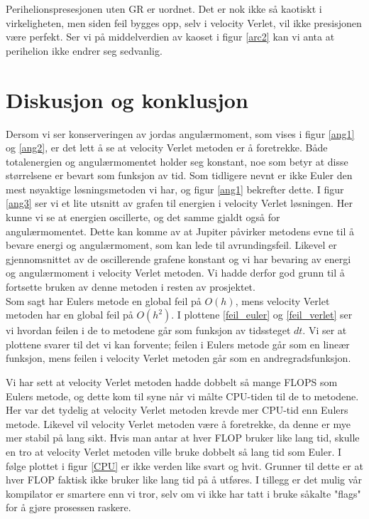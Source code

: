 \documentclass[11pt,a4paper]{article}
\begin{document}
Perihelionspresesjonen uten GR er uordnet. Det er nok ikke så kaotiskt i virkeligheten, men siden feil bygges opp, selv i velocity Verlet, vil ikke presisjonen være perfekt. Ser vi på middelverdien av kaoset i figur \ref{arc2} kan vi anta at
perihelion ikke endrer seg sedvanlig. 

\section{Diskusjon og konklusjon}
Dersom vi ser konserveringen av jordas angulærmoment, som vises i figur \ref{ang1} og \ref{ang2}, er det lett å se at velocity Verlet metoden er å foretrekke. Både totalenergien og angulærmomentet holder seg konstant, noe som betyr at disse størrelsene er bevart som funksjon av tid. Som tidligere nevnt er ikke Euler den mest nøyaktige løsningsmetoden vi har, og figur \ref{ang1} bekrefter dette. I figur \ref{ang3} ser vi et lite utsnitt av grafen til energien i velocity Verlet løsningen. Her kunne vi se at energien oscillerte, og det samme gjaldt også for angulærmomentet. Dette kan komme av at Jupiter påvirker metodens evne til å bevare energi og angulærmoment, som kan lede til avrundingsfeil. Likevel er gjennomsnittet av de oscillerende grafene konstant og vi har bevaring av energi og angulærmoment i velocity Verlet metoden. Vi hadde derfor god grunn til å fortsette bruken av denne metoden i resten av prosjektet. \\

Som sagt har Eulers metode en global feil på $O(h)$, mens velocity Verlet metoden har en global feil på $O(h^2)$. I plottene \ref{feil_euler} og \ref{feil_verlet} ser vi hvordan feilen i de to metodene går som funksjon av tidssteget $dt$. Vi ser at plottene svarer til det vi kan forvente; feilen i Eulers metode går som en lineær funksjon, mens feilen i velocity Verlet metoden går som en andregradsfunksjon. 

Vi har sett at velocity Verlet metoden hadde dobbelt så mange FLOPS som Eulers metode, og dette kom til syne når vi målte CPU-tiden til de to metodene. Her var det tydelig at velocity Verlet metoden krevde mer CPU-tid enn Eulers metode. Likevel vil velocity Verlet metoden være å foretrekke, da denne er mye mer stabil på lang sikt. Hvis man antar at hver FLOP bruker like lang tid, skulle en tro at velocity Verlet metoden ville bruke dobbelt så lang tid som Euler. I følge plottet i figur \ref{CPU} er ikke verden like svart og hvit. Grunner til dette er at hver FLOP faktisk ikke bruker like lang tid på å utføres. I tillegg er det mulig vår kompilator er smartere enn vi tror, selv om vi ikke har tatt i bruke såkalte "flags" for å gjøre prosessen raskere.\\
\end{document}
